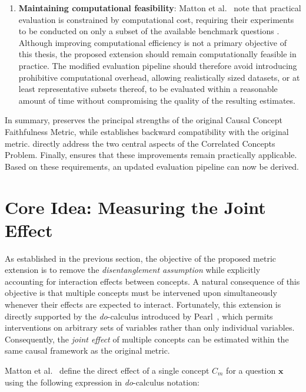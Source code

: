 \begin{enumerate}[
		label=\textbf{R\arabic*},
		ref=R\arabic*,
		wide=0pt,
		leftmargin=0pt
	]
	\item \label{req:feasibility} \textbf{Maintaining computational feasibility}:
	      Matton et al.~\cite{mattonWalkTalkMeasuring2024} note that practical evaluation is constrained by computational cost, requiring their experiments to be conducted on only a subset of the available benchmark questions \cite{mattonWalkTalkMeasuring2024}. Although improving computational efficiency is not a primary objective of this thesis, the proposed extension should remain computationally feasible in practice. The modified evaluation pipeline should therefore avoid introducing prohibitive computational overhead, allowing realistically sized datasets, or at least representative subsets thereof, to be evaluated within a reasonable amount of time without compromising the quality of the resulting estimates.
\end{enumerate}

In summary,  preserves the principal strengths of the original Causal Concept Faithfulness Metric, while  establishes backward compatibility with the original metric.  directly address the two central aspects of the Correlated Concepts Problem. Finally,  ensures that these improvements remain practically applicable. Based on these requirements, an updated evaluation pipeline can now be derived.


\section{Core Idea: Measuring the Joint Effect}
\label{sec:joint_effect}

As established in the previous section, the objective of the proposed metric extension is to remove the \emph{disentanglement assumption} while explicitly accounting for interaction effects between concepts. A natural consequence of this objective is that multiple concepts must be intervened upon simultaneously whenever their effects are expected to interact. Fortunately, this extension is directly supported by the \emph{do}-calculus introduced by Pearl~\cite{pearlCausalDiagramsEmpirical1995}, which permits interventions on arbitrary sets of variables rather than only individual variables. Consequently, the \emph{joint effect} of multiple concepts can be estimated within the same causal framework as the original metric.

Matton et al.~\cite{mattonWalkTalkMeasuring2024} define the direct effect of a single concept $C_m$ for a question $\mathbf{x}$ using the following expression in \emph{do}-calculus notation:

